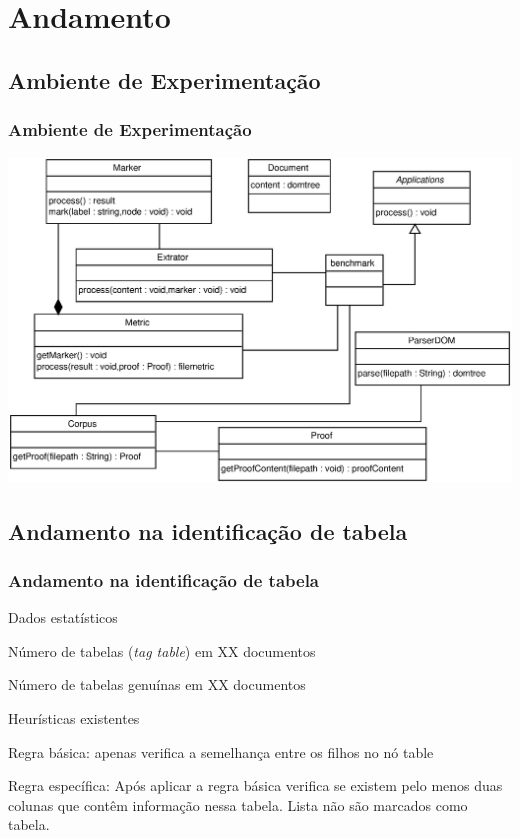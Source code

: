 \documentclass{beamer}
\newenvironment{my_itemize}{
\begin{itemize}
  \setlength{\itemsep}{5pt}
  \setlength{\parskip}{2pt}
  \setlength{\parsep}{3pt}
}{\end{itemize}}
\begin{document}
\section{Andamento}
\begin{frame}
  \subsection{Ambiente de Experimentação}
  \frametitle{Ambiente de Experimentação}
\begin{center}
  \includegraphics[width=1\textwidth]{img/classes}
\end{center}
\end{frame}

\begin{frame}
  \subsection{Andamento na identificação de tabela}
  \frametitle{Andamento na identificação de tabela}
  \begin{my_itemize}
   \item Dados estatísticos
   \begin{my_itemize}
   \item Número de tabelas (\textit{tag table}) em {\color{yellow}XX} documentos
   \item Número de tabelas genuínas em {\color{yellow}XX} documentos
   \end{my_itemize}

   \item Heurísticas existentes
   \begin{my_itemize}
   \item Regra básica: apenas verifica a semelhança entre os filhos no nó table
   \item Regra específica: Após aplicar a regra básica verifica se existem pelo menos duas colunas que contêm informação nessa tabela. Lista não são marcados como tabela.
   \end{my_itemize}
  \end{my_itemize}
\end{frame}
\end{document}
